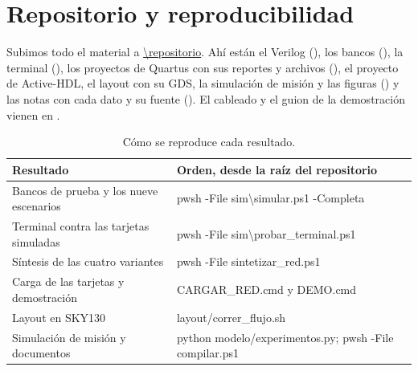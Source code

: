 \appendix
\section{Repositorio y reproducibilidad}
\label{sec:repositorio}

Subimos todo el material a \url{\repositorio}. Ahí están el Verilog (), los bancos (), la terminal (), los
proyectos de Quartus con sus reportes y archivos  (), el proyecto de Active-HDL, el layout con su GDS, la
simulación de misión y las figuras () y las notas con cada dato y su fuente (). El cableado y el guion de la
demostración vienen en .

\begin{table}[!htb]
\centering\footnotesize
\caption{Cómo se reproduce cada resultado.}
\label{tab:reproducir}
\begin{tabularx}{\textwidth}{@{}>{\raggedright\arraybackslash}p{6.6cm} >{\ttfamily\raggedright\arraybackslash}X@{}}
\toprule
\rowcolor{TableHead} \textbf{Resultado} & \normalfont\textbf{Orden, desde la raíz del repositorio} \\
\midrule
Bancos de prueba y los nueve escenarios & pwsh -File sim\textbackslash simular.ps1 -Completa \\
Terminal contra las tarjetas simuladas & pwsh -File sim\textbackslash probar\_terminal.ps1 \\
Síntesis de las cuatro variantes & pwsh -File sintetizar\_red.ps1 \\
Carga de las tarjetas y demostración & CARGAR\_RED.cmd y DEMO.cmd \\
Layout en SKY130 & layout/correr\_flujo.sh \\
Simulación de misión y documentos & python modelo/experimentos.py; pwsh -File compilar.ps1 \\
\bottomrule
\end{tabularx}
\end{table}
